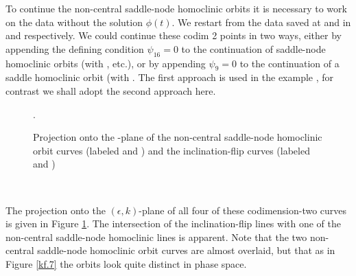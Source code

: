 \documentclass[12pt]{report}
\def\eps{\epsilon}
\begin{document}
To continue the non-central saddle-node homoclinic orbits it is
necessary to work on the data without the solution $\phi(t)$. We
restart from the data saved at  and  in
 and  respectively. We could continue these codim 2 points in two
ways, either by appending the defining condition $\psi_{16} =0$ to
the continuation of saddle-node homoclinic orbits (with ,
etc.), or by appending $\psi_{9} =0$ to the continuation 
of a saddle homoclinic orbit (with . 
The first approach is used in the example ,  
for contrast we shall adopt the second approach here.
\begin{figure}[p]
\epsfysize 9.0cm
\centerline{}
\caption{Projection onto the -plane of the non-central
saddle-node homoclinic orbit curves (labeled  and ) and the 
inclination-flip curves (labeled  and )}.
\label{kp.10}
\end{figure}
%
\begin{center}
\\
\end{center}
The projection onto the $(\eps,k)$-plane of all four of these
codimension-two curves is given in Figure \ref{kp.10}. 
The intersection of the inclination-flip lines with one of the
non-central saddle-node homoclinic lines is apparent. Note that the two
non-central saddle-node homoclinic orbit curves are almost overlaid, but
that as in Figure \ref{kf.7} the orbits look quite distinct in phase space.
\end{document}
